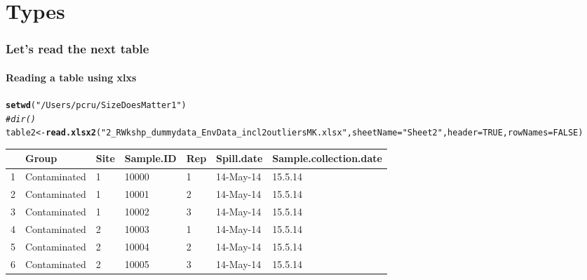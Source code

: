 \documentclass[10pt,handout,english]{beamer}\usepackage[]{graphicx}\usepackage[]{color}
\makeatletter
\newcommand{\hlnum}[1]{\textcolor[rgb]{0.686,0.059,0.569}{#1}}%
\newcommand{\hlstr}[1]{\textcolor[rgb]{0.192,0.494,0.8}{#1}}%
\newcommand{\hlcom}[1]{\textcolor[rgb]{0.678,0.584,0.686}{\textit{#1}}}%
\newcommand{\hlstd}[1]{\textcolor[rgb]{0.345,0.345,0.345}{#1}}%
\newcommand{\hlkwb}[1]{\textcolor[rgb]{0.69,0.353,0.396}{#1}}%
\newcommand{\hlkwc}[1]{\textcolor[rgb]{0.333,0.667,0.333}{#1}}%
\newcommand{\hlkwd}[1]{\textcolor[rgb]{0.737,0.353,0.396}{\textbf{#1}}}%
\newenvironment{kframe}{%
 \def\at@end@of@kframe{}%
 \ifinner\ifhmode%
  \def\at@end@of@kframe{\end{minipage}}%
  \begin{minipage}{\columnwidth}%
 \fi\fi%
 \def\FrameCommand##1{\hskip\@totalleftmargin \hskip-\fboxsep
 \colorbox{shadecolor}{##1}\hskip-\fboxsep
     \hskip-\linewidth \hskip-\@totalleftmargin \hskip\columnwidth}%
 \MakeFramed {\advance\hsize-\width
   \@totalleftmargin\z@ \linewidth\hsize
   \@setminipage}}%
 {\par\unskip\endMakeFramed%
 \at@end@of@kframe}
\newenvironment{knitrout}{}{} %
\makeatother
\begin{document}
\section*{Types}
\begin{frame}[fragile]
  \frametitle{Let's read the next table}
  \framesubtitle{Reading a table using xlxs}
\begin{knitrout}
\color{fgcolor}\begin{kframe}
\begin{alltt}
\hlkwd{setwd}\hlstd{(}\hlstr{"/Users/pcru/SizeDoesMatter1"}\hlstd{)}
\hlcom{#dir()}
\hlstd{table2}\hlkwb{<-}\hlkwd{read.xlsx2}\hlstd{(}\hlstr{"2_R Wkshp_dummy data_Env Data_incl2outliersMK.xlsx"}\hlstd{,} \hlkwc{sheetName} \hlstd{=}\hlstr{"Sheet2"}\hlstd{,}\hlkwc{header}\hlstd{=}\hlnum{TRUE}\hlstd{,}\hlkwc{rowNames}\hlstd{=}\hlnum{FALSE}\hlstd{)}
\end{alltt}
\end{kframe}
\end{knitrout}
\begin{table}[ht]
\centering
\begin{tabular}{rllllll}
  \hline
 & Group & Site & Sample.ID & Rep & Spill.date & Sample.collection.date \\ 
  \hline
1 & Contaminated & 1 & 10000 & 1 & 14-May-14 & 15.5.14 \\ 
  2 & Contaminated & 1 & 10001 & 2 & 14-May-14 & 15.5.14 \\ 
  3 & Contaminated & 1 & 10002 & 3 & 14-May-14 & 15.5.14 \\ 
  4 & Contaminated & 2 & 10003 & 1 & 14-May-14 & 15.5.14 \\ 
  5 & Contaminated & 2 & 10004 & 2 & 14-May-14 & 15.5.14 \\ 
  6 & Contaminated & 2 & 10005 & 3 & 14-May-14 & 15.5.14 \\ 
   \hline
\end{tabular}
\end{table}

\clearpage
\end{frame}
\end{document}
